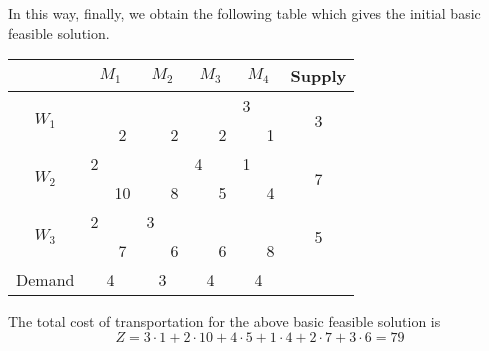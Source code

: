 \documentclass[../main-sheet.tex]{subfiles}
\begin{document}
In this way, finally, we obtain the following table which gives the initial basic feasible solution.
\begin{table}[H]
    \centering
    \begin{tabular}{|c|cc|cc|cc|cc|c|}
    \hline
                           & \multicolumn{2}{c|}{$M_1$} & \multicolumn{2}{c|}{$M_2$} & \multicolumn{2}{c|}{$M_3$} & \multicolumn{2}{c|}{$M_4$} & Supply             \\ \hline
    \multirow{2}{*}{$W_1$} &                       &    &                        &   &                        &   & 3                      &   & \multirow{2}{*}{3} \\ \cline{3-3} \cline{5-5} \cline{7-7} \cline{9-9}
                           & \multicolumn{1}{c|}{} & 2  & \multicolumn{1}{c|}{}  & 2 & \multicolumn{1}{c|}{}  & 2 & \multicolumn{1}{c|}{}  & 1 &                    \\ \hline
    \multirow{2}{*}{$W_2$} & 2                     &    &                        &   & 4                      &   & 1                      &   & \multirow{2}{*}{7} \\ \cline{3-3} \cline{5-5} \cline{7-7} \cline{9-9}
                           & \multicolumn{1}{c|}{} & 10 & \multicolumn{1}{c|}{}  & 8 & \multicolumn{1}{c|}{}  & 5 & \multicolumn{1}{c|}{}  & 4 &                    \\ \hline
    \multirow{2}{*}{$W_3$} & 2                     &    & 3                      &   &                        &   &                        &   & \multirow{2}{*}{5} \\ \cline{3-3} \cline{5-5} \cline{7-7} \cline{9-9}
                           & \multicolumn{1}{c|}{} & 7  & \multicolumn{1}{c|}{}  & 6 & \multicolumn{1}{c|}{}  & 6 & \multicolumn{1}{c|}{}  & 8 &                    \\ \hline
    Demand                 & \multicolumn{2}{c|}{4}     & \multicolumn{2}{c|}{3}     & \multicolumn{2}{c|}{4}     & \multicolumn{2}{c|}{4}     &                    \\ \hline
    \end{tabular}
\end{table}
The total cost of transportation for the above basic feasible solution is
\[
    Z=3\cdot1+2\cdot10+4\cdot5+1\cdot4+2\cdot7+3\cdot6=79
\]
\end{document}
